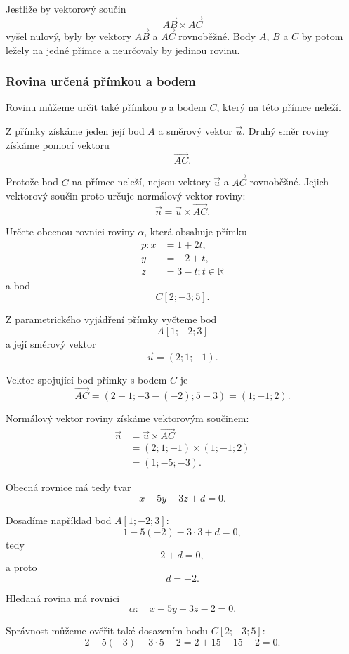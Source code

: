 \begin{remark}
    Jestliže by vektorový součin
    \[
        \overrightarrow{AB}\times\overrightarrow{AC}
    \]
    vyšel nulový, byly by vektory $\overrightarrow{AB}$ a
    $\overrightarrow{AC}$ rovnoběžné. Body $A$, $B$ a $C$ by potom
    ležely na jedné přímce a neurčovaly by jedinou rovinu.
\end{remark}


\subsubsection{Rovina určená přímkou a bodem}
\label{subsubsec:General_plane_line_point}

Rovinu můžeme určit také přímkou $p$ a bodem $C$, který na této
přímce neleží.

Z přímky získáme jeden její bod $A$ a směrový vektor $\vec{u}$.
Druhý směr roviny získáme pomocí vektoru
\[
    \overrightarrow{AC}.
\]

Protože bod $C$ na přímce neleží, nejsou vektory
$\vec{u}$ a $\overrightarrow{AC}$ rovnoběžné. Jejich vektorový součin
proto určuje normálový vektor roviny:
\[
    \vec{n}
    =
    \vec{u}\times\overrightarrow{AC}.
\]

\begin{example}
    \label{exa:General_plane_line_point}

    Určete obecnou rovnici roviny $\alpha$, která obsahuje přímku
    \[
        \begin{aligned}
            p: x&=1+2t,\\
            y&=-2+t,\\
            z&=3-t; t\in\mathbb{R}
        \end{aligned}
    \]
    a bod
    \[
        C[2;-3;5].
    \]

    Z parametrického vyjádření přímky vyčteme bod
    \[
        A[1;-2;3]
    \]
    a její směrový vektor
    \[
        \vec{u}=(2;1;-1).
    \]

    Vektor spojující bod přímky s bodem $C$ je
    \[
        \overrightarrow{AC}
        =
        (2-1;-3-(-2);5-3)
        =
        (1;-1;2).
    \]

    Normálový vektor roviny získáme vektorovým součinem:
    \begin{align*}
        \vec{n}
        &=
        \vec{u}\times\overrightarrow{AC}\\
        &=
        (2;1;-1)\times(1;-1;2)\\
        &=
        (1;-5;-3).
    \end{align*}

    Obecná rovnice má tedy tvar
    \[
        x-5y-3z+d=0.
    \]

    Dosadíme například bod $A[1;-2;3]$:
    \[
        1-5(-2)-3\cdot3+d=0,
    \]
    tedy
    \[
        2+d=0,
    \]
    a proto
    \[
        d=-2.
    \]

    Hledaná rovina má rovnici
    \[
        \alpha:\quad x-5y-3z-2=0.
    \]

    Správnost můžeme ověřit také dosazením bodu $C[2;-3;5]$:
    \[
        2-5(-3)-3\cdot5-2
        =
        2+15-15-2
        =
        0.
    \]
\end{example}


